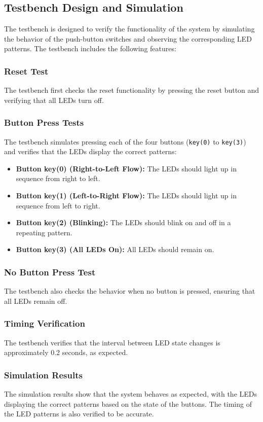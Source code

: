 \documentclass[]{article}
\begin{document}
\subsection{Testbench Design and Simulation}

The testbench is designed to verify the functionality of the system by simulating the behavior of the push-button switches and observing the corresponding LED patterns. The testbench includes the following features:

\subsubsection{Reset Test}
The testbench first checks the reset functionality by pressing the reset button and verifying that all LEDs turn off.

\subsubsection{Button Press Tests}
The testbench simulates pressing each of the four buttons (\texttt{key(0)} to \texttt{key(3)}) and verifies that the LEDs display the correct patterns:
\begin{itemize}
    \item \textbf{Button key(0) (Right-to-Left Flow):} The LEDs should light up in sequence from right to left.
    \item \textbf{Button key(1) (Left-to-Right Flow):} The LEDs should light up in sequence from left to right.
    \item \textbf{Button key(2) (Blinking):} The LEDs should blink on and off in a repeating pattern.
    \item \textbf{Button key(3) (All LEDs On):} All LEDs should remain on.
\end{itemize}

\subsubsection{No Button Press Test}
The testbench also checks the behavior when no button is pressed, ensuring that all LEDs remain off.

\subsubsection{Timing Verification}
The testbench verifies that the interval between LED state changes is approximately 0.2 seconds, as expected.

\subsubsection{Simulation Results}
The simulation results show that the system behaves as expected, with the LEDs displaying the correct patterns based on the state of the buttons. The timing of the LED patterns is also verified to be accurate.
\end{document}
